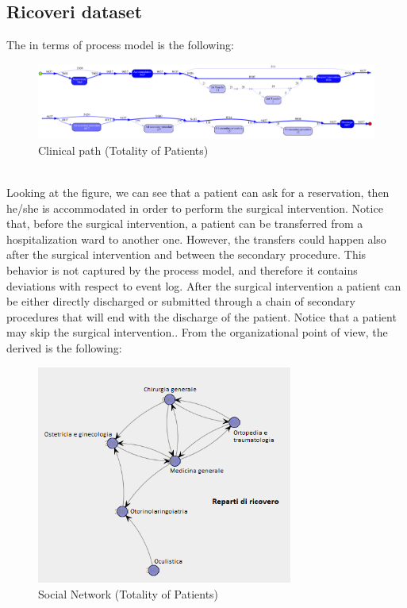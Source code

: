 \subsection{Ricoveri dataset}\label{analysis:3}
The  in terms of process model is the following:
\begin{figure} [htbp]
\includegraphics[width=\textwidth]{RicoveriProcessModel2}
\caption{Clinical path (Totality of Patients)}
\end{figure}\\
Looking at the figure, we can see that a patient can ask for a reservation, then he/she is accommodated in order to perform the surgical intervention. Notice that, before the surgical intervention, a patient can be transferred from a hospitalization ward to another one. However, the transfers could happen also after the surgical intervention and between the secondary procedure. This behavior is not captured by the process model, and therefore it contains deviations with respect to event log. After the surgical intervention a patient can be either directly discharged or submitted through a chain of secondary procedures that will end with the discharge
of the patient. Notice that a patient may skip the surgical intervention.. From the organizational point of view, the derived  is the following:
\begin{figure} [htbp]
\includegraphics[width=0.75\textwidth]{RicoveriSocialNetwork}
\caption{Social Network (Totality of Patients)}
\end{figure}\\
